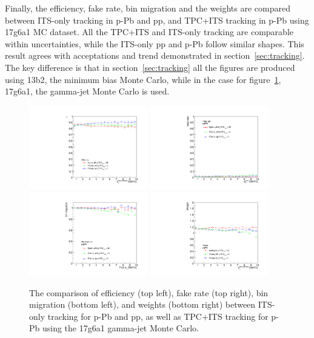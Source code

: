 Finally, the efficiency, fake rate, bin migration and the weights are compared between ITS-only tracking in p-Pb and pp, and TPC+ITS tracking in p-Pb using 17g6a1 MC dataset. All the TPC+ITS and ITS-only tracking are comparable within uncertainties, while the ITS-only pp and p-Pb follow similar shapes. This result agrees with acceptations and trend demonstrated in section~\ref{sec:tracking}. The key difference is that in section~\ref{sec:tracking} all the figures are produced using 13b2, the minimum bias Monte Carlo, while in the case for figure~\ref{fig:TPCITSpp_pPbCompare}, 17g6a1, the gamma-jet Monte Carlo is used. 
\begin{figure}[h]
\center
\includegraphics[width=0.46\textwidth]{Checks_Systematics/ITSchi2_study_efficiency.pdf}
\includegraphics[width=0.46\textwidth]{Checks_Systematics/ITSchi2_study_fakerate.pdf}
\includegraphics[width=0.46\textwidth]{Checks_Systematics/ITSchi2_study_binMigration.pdf}
\includegraphics[width=0.46\textwidth]{Checks_Systematics/ITSchi2_study_weight.pdf}
\caption{The comparison of efficiency (top left), fake rate (top right), bin migration (bottom left), and weights (bottom right) between ITS-only tracking for p-Pb and pp, as well as TPC+ITS tracking for p-Pb using the 17g6a1 gamma-jet Monte Carlo.}
\label{fig:TPCITSpp_pPbCompare}

\end{figure}

